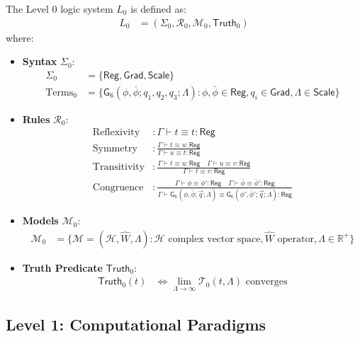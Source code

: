 \begin{definition}
The Level 0 logic system $L_0$ is defined as:
\begin{align}
L_0 &= (\Sigma_0, \mathcal{R}_0, \mathcal{M}_0, \mathsf{Truth}_0)
\end{align}
where:
\begin{itemize}
\item \textbf{Syntax} $\Sigma_0$:
  \begin{align}
  \Sigma_0 &= \{\mathsf{Reg}, \mathsf{Grad}, \mathsf{Scale}\}\\
  \text{Terms}_0 &= \{\mathsf{G}_6(\phi,\bar{\phi};q_1,q_2,q_3;\Lambda) : \phi,\bar{\phi} \in \mathsf{Reg}, q_i \in \mathsf{Grad}, \Lambda \in \mathsf{Scale}\}
  \end{align}
\item \textbf{Rules} $\mathcal{R}_0$:
  \begin{align}
  \text{Reflexivity} &: \Gamma \vdash t \equiv t : \mathsf{Reg}\\
  \text{Symmetry} &: \frac{\Gamma \vdash t \equiv u : \mathsf{Reg}}{\Gamma \vdash u \equiv t : \mathsf{Reg}}\\
  \text{Transitivity} &: \frac{\Gamma \vdash t \equiv u : \mathsf{Reg} \quad \Gamma \vdash u \equiv v : \mathsf{Reg}}{\Gamma \vdash t \equiv v : \mathsf{Reg}}\\
  \text{Congruence} &: \frac{\Gamma \vdash \phi \equiv \phi' : \mathsf{Reg} \quad \Gamma \vdash \bar{\phi} \equiv \bar{\phi}' : \mathsf{Reg}}{\Gamma \vdash \mathsf{G}_6(\phi,\bar{\phi};\vec{q};\Lambda) \equiv \mathsf{G}_6(\phi',\bar{\phi}';\vec{q};\Lambda) : \mathsf{Reg}}
  \end{align}
\item \textbf{Models} $\mathcal{M}_0$:
  \begin{align}
  \mathcal{M}_0 &= \{\mathcal{M} = (\mathcal{H}, \hat{W}, \Lambda) : \mathcal{H} \text{ complex vector space}, \hat{W} \text{ operator}, \Lambda \in \mathbb{R}^+\}
  \end{align}
\item \textbf{Truth Predicate} $\mathsf{Truth}_0$:
  \begin{align}
  \mathsf{Truth}_0(t) &\Leftrightarrow \lim_{\Lambda \to \infty} \mathcal{T}_0(t, \Lambda) \text{ converges}
  \end{align}
\end{itemize}
\end{definition}

\subsection{Level 1: Computational Paradigms}

